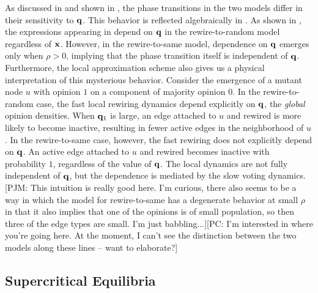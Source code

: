 \documentclass[review, onefignum, onetabnum]{siamart171218}
\newcommand{\pjm}[1]{{\color{blue}[PJM: #1]}}
\newcommand{\pc}[1]{{\color{comment_purple}[PC: #1]}}
\begin{document}
		As discussed in \cite{Durrett2012} and shown in , the phase transitions in the two models differ in their sensitivity to $\mathbf{q}$. 
		This behavior is reflected algebraically in .
		As shown in , the expressions appearing in  depend on $\mathbf{q}$ in the rewire-to-random model regardless of $\mathbf{x}$. 
		However,  in the rewire-to-same model, dependence on $\mathbf{q}$ emerges only when $\rho > 0$, implying that the phase transition itself is independent of $\mathbf{q}$. 
		Furthermore, the local approximation scheme also gives us a physical interpretation of this mysterious behavior. 
		Consider the emergence of a mutant node $u$ with opinion $1$ on a component of majority opinion $0$. 
		In the rewire-to-random case, the fast local rewiring dynamics depend explicitly on $\mathbf{q}$, the \emph{global} opinion densities. 
		When $\mathbf{q}_1$ is large, an edge attached to $u$ and rewired is more likely to become inactive, resulting in fewer active edges in the neighborhood of $u$. 
		In the rewire-to-same case, however, the fast rewiring does not explicitly depend on $\mathbf{q}$. 
		An active edge attached to $u$ and rewired becomes inactive with probability $1$, regardless of the value of $\mathbf{q}$. 
		The local dynamics are not fully independent of $\mathbf{q}$, but the dependence is mediated by the slow voting dynamics. 
		 \pjm{This intuition is really good here. I'm curious, there also seems to be a way in which the model for rewire-to-same has a degenerate behavior at small $\rho$ in that it also implies that one of the opinions is of small population, so then three of the edge types are small. I'm just babbling...}\pc{I'm interested in where you're going here. At the moment, I can't see the distinction between the two models along these lines -- want to elaborate?}
	
	\subsection{Supercritical Equilibria}
		
\end{document}
